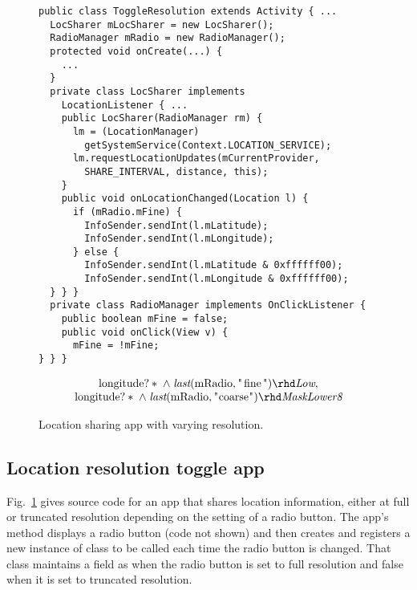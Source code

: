 \documentclass{entcs} \usepackage{entcsmacro}
\newcommand{\code}[1]{\text{\lstinline!#1!}}
\newcommand{\tlast}[2]{\textit{last}(#1, #2)}
\begin{document}

\begin{figure}[t!]
\begin{lstlisting}[name=Ex]
public class ToggleResolution extends Activity { ...
  LocSharer mLocSharer = new LocSharer();
  RadioManager mRadio = new RadioManager();
  protected void onCreate(...) {
    ...
  }
  private class LocSharer implements
    LocationListener { ... 
    public LocSharer(RadioManager rm) {
      lm = (LocationManager) 
        getSystemService(Context.LOCATION_SERVICE);
      lm.requestLocationUpdates(mCurrentProvider, 
        SHARE_INTERVAL, distance, this);
    }
    public void onLocationChanged(Location l) {
      if (mRadio.mFine) {
        InfoSender.sendInt(l.mLatitude);
        InfoSender.sendInt(l.mLongitude);
      } else {
        InfoSender.sendInt(l.mLatitude & 0xffffff00);
        InfoSender.sendInt(l.mLongitude & 0xffffff00);
  } } }
  private class RadioManager implements OnClickListener {
    public boolean mFine = false;
    public void onClick(View v) {
      mFine = !mFine;
} } }
\end{lstlisting}

\begin{displaymath}
  \begin{array}{c}
    \code{longitude}?\ast \;\wedge\; \tlast{\code{mRadio}}{\code{"fine"}} \rhd
    \textit{Low}, \\
    \code{longitude}?\ast \;\wedge\; \tlast{\code{mRadio}}{\code{"coarse"}} \rhd
    \textit{MaskLower8}
  \end{array}
\end{displaymath}
\caption{Location sharing app with varying resolution.}
\label{fig:app-loc-toggle}
\end{figure}

\subsection{Location resolution toggle app}

Fig.~\ref{fig:app-loc-toggle} gives source code for an app that
shares location information, either at full or truncated resolution
depending on the setting of a radio button. The app's \code{onCreate}
method displays a radio button (code not shown) and then creates and
registers a new instance of class \code{RadioManager} to be called
each time the radio button is changed. That
class maintains a field \code{mFine} as \code{true} when the radio button is
set to full resolution and false when it is set to truncated
resolution.
\end{document}

